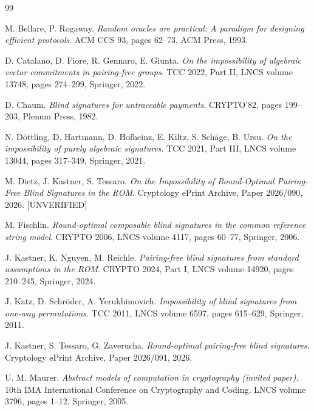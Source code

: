 \documentclass{conjura-conjecture}
\begin{document}
\begin{conjurabibliography}{99}

M. Bellare, P. Rogaway.
\emph{Random oracles are practical: A paradigm for designing efficient
protocols}.
ACM CCS 93, pages 62--73, ACM Press, 1993.

D. Catalano, D. Fiore, R. Gennaro, E. Giunta.
\emph{On the impossibility of algebraic vector commitments in
pairing-free groups}.
TCC 2022, Part II, LNCS volume 13748, pages 274--299, Springer, 2022.

D. Chaum.
\emph{Blind signatures for untraceable payments}.
CRYPTO'82, pages 199--203, Plenum Press, 1982.

N. D\"ottling, D. Hartmann, D. Hofheinz, E. Kiltz, S. Sch\"age,
B. Ursu.
\emph{On the impossibility of purely algebraic signatures}.
TCC 2021, Part III, LNCS volume 13044, pages 317--349, Springer, 2021.

M. Dietz, J. Kastner, S. Tessaro.
\emph{On the Impossibility of Round-Optimal Pairing-Free Blind
Signatures in the ROM}.
Cryptology ePrint Archive, Paper 2026/090, 2026. [UNVERIFIED]

M. Fischlin.
\emph{Round-optimal composable blind signatures in the common reference
string model}.
CRYPTO 2006, LNCS volume 4117, pages 60--77, Springer, 2006.

J. Kastner, K. Nguyen, M. Reichle.
\emph{Pairing-free blind signatures from standard assumptions in the
ROM}.
CRYPTO 2024, Part I, LNCS volume 14920, pages 210--245, Springer, 2024.

J. Katz, D. Schr\"oder, A. Yerukhimovich.
\emph{Impossibility of blind signatures from one-way permutations}.
TCC 2011, LNCS volume 6597, pages 615--629, Springer, 2011.

J. Kastner, S. Tessaro, G. Zaverucha.
\emph{Round-optimal pairing-free blind signatures}.
Cryptology ePrint Archive, Paper 2026/091, 2026.

U. M. Maurer.
\emph{Abstract models of computation in cryptography (invited paper)}.
10th IMA International Conference on Cryptography and Coding, LNCS
volume 3796, pages 1--12, Springer, 2005.

\end{conjurabibliography}
\end{document}
